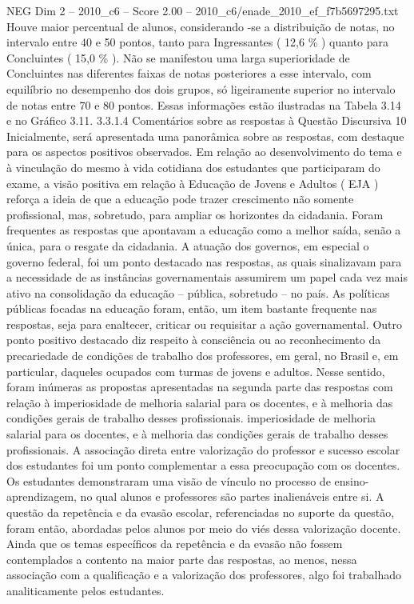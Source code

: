 \begin{textsample}{NEG Dim 2 – 2010\_c6 – Score 2.00 – 2010\_c6/enade\_2010\_ef\_f7b5697295.txt}
Houve maior percentual de alunos, considerando -se a distribuição de notas, no intervalo entre 40 e 50 pontos, tanto para Ingressantes ( 12,6 \% ) quanto para Concluintes ( 15,0 \% ).
Não se manifestou uma larga superioridade de Concluintes nas diferentes faixas de notas posteriores a esse intervalo, com equilíbrio no desempenho dos dois grupos, só ligeiramente superior no intervalo de notas entre 70 e 80 pontos.
Essas informações estão ilustradas na Tabela 3.14 e no Gráfico 3.11. 3.3.1.4 Comentários sobre as respostas à Questão Discursiva 10 Inicialmente, será apresentada uma panorâmica sobre as respostas, com destaque para os aspectos positivos observados.
Em relação ao desenvolvimento do tema e à vinculação do mesmo à vida cotidiana dos estudantes que participaram do exame, a visão positiva em relação à Educação de Jovens e Adultos ( EJA ) reforça a ideia de que a educação pode trazer crescimento não somente profissional, mas, sobretudo, para ampliar os horizontes da cidadania.
Foram frequentes as respostas que apontavam a educação como a melhor saída, senão a única, para o resgate da cidadania.
A atuação dos governos, em especial o governo federal, foi um ponto destacado nas respostas, as quais sinalizavam para a necessidade de as instâncias governamentais assumirem um papel cada vez mais ativo na consolidação da educação – pública, sobretudo – no país.
As políticas públicas focadas na educação foram, então, um item bastante frequente nas respostas, seja para enaltecer, criticar ou requisitar a ação governamental.
Outro ponto positivo destacado diz respeito à consciência ou ao reconhecimento da precariedade de condições de trabalho dos professores, em geral, no Brasil e, em particular, daqueles ocupados com turmas de jovens e adultos.
Nesse sentido, foram inúmeras as propostas apresentadas na segunda parte das respostas com relação à imperiosidade de melhoria salarial para os docentes, e à melhoria das condições gerais de trabalho desses profissionais. imperiosidade de melhoria salarial para os docentes, e à melhoria das condições gerais de trabalho desses profissionais.
A associação direta entre valorização do professor e sucesso escolar dos estudantes foi um ponto complementar a essa preocupação com os docentes.
Os estudantes demonstraram uma visão de vínculo no processo de ensino-aprendizagem, no qual alunos e professores são partes inalienáveis entre si.
A questão da repetência e da evasão escolar, referenciadas no suporte da questão, foram então, abordadas pelos alunos por meio do viés dessa valorização docente.
Ainda que os temas específicos da repetência e da evasão não fossem contemplados a contento na maior parte das respostas, ao menos, nessa associação com a qualificação e a valorização dos professores, algo foi trabalhado analiticamente pelos estudantes.

\end{textsample}
